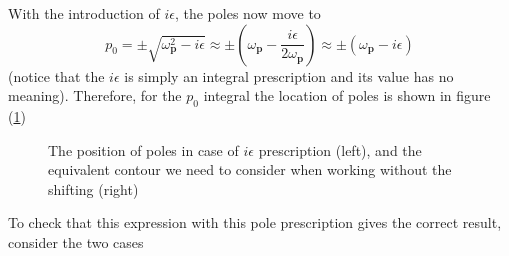 \documentclass[11pt, notitlepage]{report}
\newcommand{\w}{\omega}
\numberwithin{equation}{section}
\begin{document}
    With the introduction of \(i\epsilon\), the poles now move to 
    \begin{equation*}
        p_0 = \pm \sqrt{\w_\textbf{p}^2 - i\epsilon} \approx \pm \left( \w_\textbf{p} - \frac{i\epsilon}{2\w_\textbf{p}} \right) \approx \pm (\w_\textbf{p} - i\epsilon)
    \end{equation*}
    (notice that the \(i\epsilon\) is simply an integral prescription and its value has no meaning). Therefore, for the \(p_0\) integral the location of poles is shown in figure (\ref{fig:prescription})
    \begin{figure}[h]
        \centering
        \caption{The position of poles in case of \(i\epsilon\) prescription (left), and the equivalent contour we need to consider when working without the shifting (right)}\label{fig:prescription}
    \end{figure}

    To check that this expression with this pole prescription gives the correct result, consider the two cases\\
\end{document}
